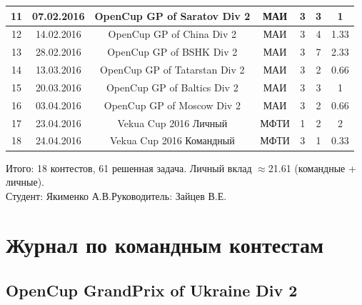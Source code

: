 \documentclass[a4paper,12pt]{article}
\begin{document}
\begin{table}[ht!]
\begin{tabular}{|c|c|c|c|c|c|c|}
11 & 07.02.2016 & OpenCup GP of Saratov 	Div 2  & МАИ & 3 & 3 & 1 		 \\ \hline

12 & 14.02.2016 & OpenCup GP of China Div 2    & МАИ & 3 & 4 & 1.33 	 \\ \hline

13 & 28.02.2016 & OpenCup GP of BSHK Div 2 & МАИ & 3 & 7 & 2.33 \\ \hline

14 & 13.03.2016 & OpenCup GP of Tatarstan Div 2     & МАИ & 3 & 2 & 0.66 \\ \hline

15 & 20.03.2016 & OpenCup GP of Baltics Div 2  & МАИ & 3 & 3 & 1	   \\ \hline

16 & 03.04.2016 & OpenCup GP of Moscow Div 2   & МАИ & 3 & 2 & 0.66   \\ \hline

17 & 23.04.2016 & Vekua Cup 2016 Личный  & МФТИ & 1 & 2 & 2	  \\ \hline

18 & 24.04.2016 & Vekua Cup 2016 Командный & МФТИ & 3 & 1 & 0.33 \\ \hline

\end{tabular}
\end{table}

Итого: 18 контестов, 61 решенная задача. Личный вклад $\approx$21.61 (командные + личные). \\

\noindent Студент:\underline{\hspace{3cm}} Якименко А.В.\hfill Руководитель:\underline{\hspace{3cm}} Зайцев В.Е.




\newpage
\section{Журнал по командным контестам}



%
%
\subsection{OpenCup GrandPrix of Ukraine Div 2}
\end{document}
